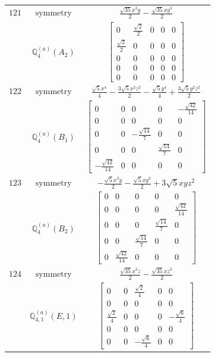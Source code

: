\documentclass[fleqn,8pt,landscape]{jsarticle}
\begin{document}
\begin{longtable}{ccc}
$ 121 $ & $ \text{symmetry} $ & $ \frac{\sqrt{35} x^{3} y}{2} - \frac{\sqrt{35} x y^{3}}{2} $ \\
$  $ & $ \mathbb{Q}_{4}^{(a)}(A_{2}) $ & $ \begin{bmatrix} 0 & \frac{\sqrt{2}}{2} & 0 & 0 & 0 \\ \frac{\sqrt{2}}{2} & 0 & 0 & 0 & 0 \\ 0 & 0 & 0 & 0 & 0 \\ 0 & 0 & 0 & 0 & 0 \\ 0 & 0 & 0 & 0 & 0 \end{bmatrix} $ \\ \hline
$ 122 $ & $ \text{symmetry} $ & $ \frac{\sqrt{5} x^{4}}{4} - \frac{3 \sqrt{5} x^{2} z^{2}}{2} - \frac{\sqrt{5} y^{4}}{4} + \frac{3 \sqrt{5} y^{2} z^{2}}{2} $ \\
$  $ & $ \mathbb{Q}_{4}^{(a)}(B_{1}) $ & $ \begin{bmatrix} 0 & 0 & 0 & 0 & - \frac{\sqrt{42}}{14} \\ 0 & 0 & 0 & 0 & 0 \\ 0 & 0 & - \frac{\sqrt{14}}{7} & 0 & 0 \\ 0 & 0 & 0 & \frac{\sqrt{14}}{7} & 0 \\ - \frac{\sqrt{42}}{14} & 0 & 0 & 0 & 0 \end{bmatrix} $ \\ \hline
$ 123 $ & $ \text{symmetry} $ & $ - \frac{\sqrt{5} x^{3} y}{2} - \frac{\sqrt{5} x y^{3}}{2} + 3 \sqrt{5} x y z^{2} $ \\
$  $ & $ \mathbb{Q}_{4}^{(a)}(B_{2}) $ & $ \begin{bmatrix} 0 & 0 & 0 & 0 & 0 \\ 0 & 0 & 0 & 0 & \frac{\sqrt{42}}{14} \\ 0 & 0 & 0 & \frac{\sqrt{14}}{7} & 0 \\ 0 & 0 & \frac{\sqrt{14}}{7} & 0 & 0 \\ 0 & \frac{\sqrt{42}}{14} & 0 & 0 & 0 \end{bmatrix} $ \\ \hline
$ 124 $ & $ \text{symmetry} $ & $ \frac{\sqrt{35} x^{3} z}{2} - \frac{\sqrt{35} x z^{3}}{2} $ \\
$  $ & $ \mathbb{Q}_{4,1}^{(a)}(E,1) $ & $ \begin{bmatrix} 0 & 0 & \frac{\sqrt{2}}{4} & 0 & 0 \\ 0 & 0 & 0 & 0 & 0 \\ \frac{\sqrt{2}}{4} & 0 & 0 & 0 & - \frac{\sqrt{6}}{4} \\ 0 & 0 & 0 & 0 & 0 \\ 0 & 0 & - \frac{\sqrt{6}}{4} & 0 & 0 \end{bmatrix} $ \\ \hline

\end{longtable}
\end{document}
